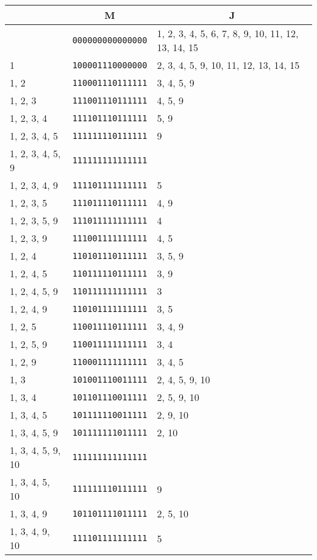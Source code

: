 \documentclass[a4paper,12pt]{article}
\begin{document}
    \begin{longtable}{l|l|l}
        &\multicolumn{1}{c|}{M}&\multicolumn{1}{|c}{J}\\
        \hline
        \endhead
        &\texttt{000000000000000}&1, 2, 3, 4, 5, 6, 7, 8, 9, 10, 11, 12, 13, 14, 15\\
        1&\texttt{100001110000000}&2, 3, 4, 5, 9, 10, 11, 12, 13, 14, 15\\
        1, 2&\texttt{110001110111111}&3, 4, 5, 9\\
        1, 2, 3&\texttt{111001110111111}&4, 5, 9\\
        1, 2, 3, 4&\texttt{111101110111111}&5, 9\\
        1, 2, 3, 4, 5&\texttt{111111110111111}&9\\
        1, 2, 3, 4, 5, 9&\texttt{111111111111111}&\\
        1, 2, 3, 4, 9&\texttt{111101111111111}&5\\
        1, 2, 3, 5&\texttt{111011110111111}&4, 9\\
        1, 2, 3, 5, 9&\texttt{111011111111111}&4\\
        1, 2, 3, 9&\texttt{111001111111111}&4, 5\\
        1, 2, 4&\texttt{110101110111111}&3, 5, 9\\
        1, 2, 4, 5&\texttt{110111110111111}&3, 9\\
        1, 2, 4, 5, 9&\texttt{110111111111111}&3\\
        1, 2, 4, 9&\texttt{110101111111111}&3, 5\\
        1, 2, 5&\texttt{110011110111111}&3, 4, 9\\
        1, 2, 5, 9&\texttt{110011111111111}&3, 4\\
        1, 2, 9&\texttt{110001111111111}&3, 4, 5\\
        1, 3&\texttt{101001110011111}&2, 4, 5, 9, 10\\
        1, 3, 4&\texttt{101101110011111}&2, 5, 9, 10\\
        1, 3, 4, 5&\texttt{101111110011111}&2, 9, 10\\
        1, 3, 4, 5, 9&\texttt{101111111011111}&2, 10\\
        1, 3, 4, 5, 9, 10&\texttt{111111111111111}&\\
        1, 3, 4, 5, 10&\texttt{111111110111111}&9\\
        1, 3, 4, 9&\texttt{101101111011111}&2, 5, 10\\
        1, 3, 4, 9, 10&\texttt{111101111111111}&5\\

\end{longtable}
\end{document}
